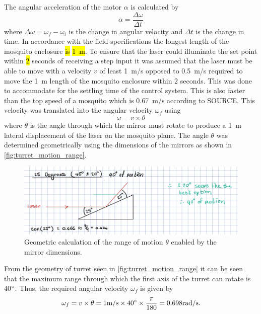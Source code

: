 The angular acceleration of the motor $\alpha$ is calculated by
\begin{equation}
    \alpha = \frac{\Delta\omega}{\Delta t}
    \label{eq:angular_acceleration}
\end{equation}
where $\Delta\omega = \omega_f - \omega_i$ is the change in angular velocity and $\Delta t$ is the change in time. In accordance with the field specifications the longest length of the mosquito enclosure \hl{is} \hl{1~m}. To ensure that the laser could illuminate the set point within \hl{2} seconds of receiving a step input it was assumed that the laser must be able to move with a velocity $v$ of least 1~m/s opposed to 0.5~m/s required to move the 1~m length of the mosquito enclosure within 2 seconds. This was done to accommodate for the settling time of the control system. This is also faster than the top speed of a mosquito which is 0.67~m/s according to SOURCE. This velocity was translated into the angular velocity $\omega_f$ using
\begin{equation}
    \omega = v \times \theta
    \label{eq:angular_velocity}
\end{equation}
where $\theta$ is the angle through which the mirror must rotate to produce a 1~m lateral displacement of the laser on the mosquito plane. The angle $\theta$ was determined geometrically using the dimensions of the mirrors as shown in \autoref{fig:turret_motion_range}.
\begin{figure}[H]
    \centering
    \includegraphics[width=\textwidth]{figures/turret_motion_range.png}
    \caption{Geometric calculation of the range of motion $\theta$ enabled by the mirror dimensions.}
    \label{fig:turret_motion_range}
\end{figure}
From the geometry of turret seen in \autoref{fig:turret_motion_range} it can be seen that the maximum range through which the first axis of the turret can rotate is 40$^{\circ}$. Thus, the required angular velocity $\omega_f$ is given by
\begin{equation}
    \omega_f = v \times \theta = 1 \text{m/s} \times 40^{\circ} \times \frac{\pi}{180} = 0.698 \text{rad/s}.
    \label{eq:angular_velocity_calculation}
\end{equation}


